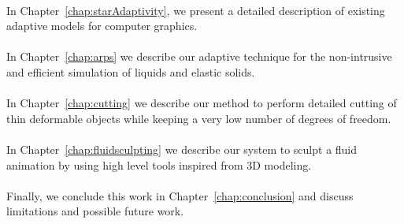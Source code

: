 \paragraph*{}
In Chapter~\ref{chap:starAdaptivity}, we present a detailed description of existing adaptive models for computer graphics.
\paragraph*{}
In Chapter~\ref{chap:arps} we describe our adaptive technique for the non-intrusive and efficient simulation of liquids and elastic solids.
\paragraph*{}
In Chapter~\ref{chap:cutting} we describe our method to perform detailed cutting of thin deformable objects while keeping a very low number of degrees of freedom.
\paragraph*{}
In Chapter~\ref{chap:fluidsculpting} we describe our system to sculpt  a fluid animation by using high level tools inspired from 3D modeling.
\paragraph*{}
Finally, we conclude this work in Chapter~\ref{chap:conclusion} and discuss limitations and possible future work.

